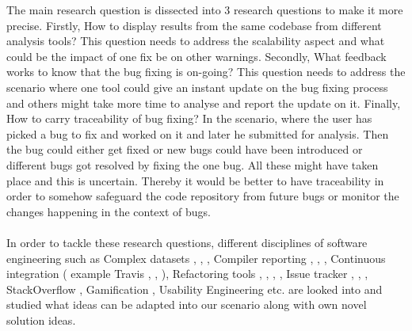 The main research question is dissected into 3 research questions to make it more precise. Firstly, How to display results from the same codebase from different analysis tools?  This question needs to address the scalability aspect and what could be the impact of one fix be on other warnings. Secondly, What feedback works to know that the bug fixing is on-going? This question needs to address the scenario where one tool could give an instant update on the bug fixing process and others might take more time to analyse and report the update on it. Finally, How to carry traceability of bug fixing? In the scenario, where the user has picked a bug to fix and worked on it and later he submitted for analysis. Then the bug could either get fixed or new bugs could have been introduced or different bugs got resolved by fixing the one bug. All these might have taken place and this is uncertain. Thereby it would be better to have traceability in order to somehow safeguard the code repository from future bugs or monitor the changes happening in the context of bugs. \\ \\

In order to tackle these research questions, different disciplines of software engineering such as Complex datasets \cite{Dix}, \cite{Ruan}, \cite{Gaur}, Compiler reporting \cite{horning}, \cite{Sun}, \cite{Yannis}, Continuous integration \cite{Stahl} ( example Travis \cite{Beller}, \cite{Gallaba}, \cite{Widder}), Refactoring tools \cite{dustinca}, \cite{Hayashi}, \cite{Mealy}, \cite{Pinto}, Issue tracker \cite{Baysal}, \cite{Jayarajah}, \cite{Raza}, StackOverflow \cite{stack} \cite{Treude.2011}, Gamification \cite{gamify} , Usability Engineering \cite{usability} etc. are looked into and studied what ideas can be adapted into our scenario along with own novel solution ideas. \\ \\

\let\cleardoublepage\clearpage
